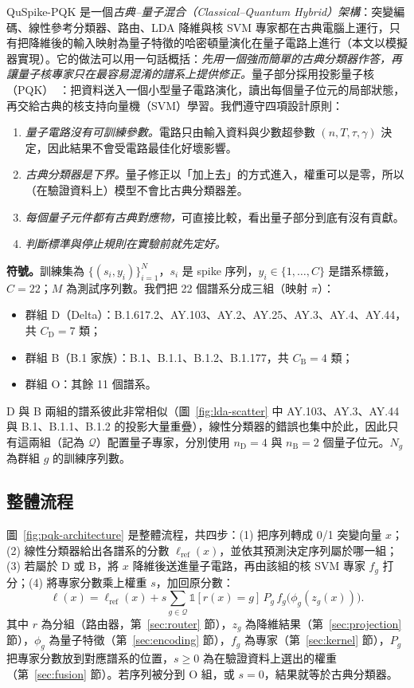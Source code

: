 \documentclass[10pt,a4paper]{article}
\begin{document}
QuSpike-PQK 是一個\emph{古典--量子混合（Classical--Quantum Hybrid）架構}：突變編碼、線性參考分類器、路由、LDA 降維與核 SVM 專家都在古典電腦上運行，只有把降維後的輸入映射為量子特徵的哈密頓量演化在量子電路上進行（本文以模擬器實現）。它的做法可以用一句話概括：\emph{先用一個強而簡單的古典分類器作答，再讓量子核專家只在最容易混淆的譜系上提供修正。}量子部分採用投影量子核（PQK）~\cite{huang2021power}：把資料送入一個小型量子電路演化，讀出每個量子位元的局部狀態，再交給古典的核支持向量機（SVM）學習。我們遵守四項設計原則：
\begin{enumerate}[label=P\arabic*)]
    \item \textit{量子電路沒有可訓練參數。}電路只由輸入資料與少數超參數 $(n,T,\tau,\gamma)$ 決定，因此結果不會受電路最佳化好壞影響。
    \item \textit{古典分類器是下界。}量子修正以「加上去」的方式進入，權重可以是零，所以（在驗證資料上）模型不會比古典分類器差。
    \item \textit{每個量子元件都有古典對應物，}可直接比較，看出量子部分到底有沒有貢獻。
    \item \textit{判斷標準與停止規則在實驗前就先定好。}
\end{enumerate}

\textbf{符號。}訓練集為 $\{(s_i,y_i)\}_{i=1}^{N}$，$s_i$ 是 spike 序列，$y_i\in\{1,\dots,C\}$ 是譜系標籤，$C=22$；$M$ 為測試序列數。我們把 22 個譜系分成三組（映射 $\pi$）：
\begin{itemize}
    \item 群組 D（Delta）：B.1.617.2、AY.103、AY.2、AY.25、AY.3、AY.4、AY.44，共 $C_{\mathrm{D}}=7$ 類；
    \item 群組 B（B.1 家族）：B.1、B.1.1、B.1.2、B.1.177，共 $C_{\mathrm{B}}=4$ 類；
    \item 群組 O：其餘 11 個譜系。
\end{itemize}
D 與 B 兩組的譜系彼此非常相似（圖~\ref{fig:lda-scatter} 中 AY.103、AY.3、AY.44 與 B.1、B.1.1、B.1.2 的投影大量重疊），線性分類器的錯誤也集中於此，因此只有這兩組（記為 $\mathcal{Q}$）配置量子專家，分別使用 $n_{\mathrm{D}}=4$ 與 $n_{\mathrm{B}}=2$ 個量子位元。$N_g$ 為群組 $g$ 的訓練序列數。

\subsection{整體流程}
\label{sec:architecture}

圖~\ref{fig:pqk-architecture} 是整體流程，共四步：(1) 把序列轉成 0/1 突變向量 $x$；(2) 線性分類器給出各譜系的分數 $\ell_{\mathrm{ref}}(x)$，並依其預測決定序列屬於哪一組；(3) 若屬於 D 或 B，將 $x$ 降維後送進量子電路，再由該組的核 SVM 專家 $f_g$ 打分；(4) 將專家分數乘上權重 $s$，加回原分數：
\begin{equation}
    \ell(x)=\ell_{\mathrm{ref}}(x)
    +s\sum_{g\in\mathcal{Q}}\mathbb{1}[r(x)=g]\,P_g\,f_g\!\big(\phi_g(z_g(x))\big).
    \label{eq:master}
\end{equation}
其中 $r$ 為分組（路由器，第~\ref{sec:router} 節），$z_g$ 為降維結果（第~\ref{sec:projection} 節），$\phi_g$ 為量子特徵（第~\ref{sec:encoding} 節），$f_g$ 為專家（第~\ref{sec:kernel} 節），$P_g$ 把專家分數放到對應譜系的位置，$s\ge0$ 為在驗證資料上選出的權重（第~\ref{sec:fusion} 節）。若序列被分到 O 組，或 $s=0$，結果就等於古典分類器。
\end{document}
